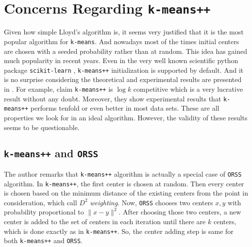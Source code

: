 \documentclass[12pt]{article}
\begin{document}
	\section{Concerns Regarding \texttt{k-means++}}\label{sec:kmeans++vsorss}
	Given how simple Lloyd's algorithm is, it seems very justified that it is the most popular algorithm for \texttt{k-means}. And nowadays most of the times initial centers are chosen with a seeded probability rather than at random. This idea has gained much popularity in recent years. Even in the very well known scientific python package \texttt{scikit-learn} \textcite{pedregosa__et_al_2011}, \texttt{k-means++} initialization is supported by default. And it is no surprise considering the theoretical and experimental results are presented in \textcite{arthur_vassilvitskii_2007}. For example, \textcite{arthur_vassilvitskii_2007} claim \texttt{k-means++} is $\log{k}$ competitive which is a very lucrative result without any doubt. Moreover, they show experimental results that \texttt{k-means++} performs tenfold or even better in most data sets. These are all properties we look for in an ideal algorithm. However, the validity of these results seems to be questionable.
	\subsection{\texttt{k-means++} and \texttt{ORSS}}
	The author remarks that \texttt{k-means++} algorithm is actually a special case of \texttt{ORSS} algorithm. In \texttt{k-means++}, the first center is chosen at random. Then every center is chosen based on the minimum distance of the existing centers from the point in consideration, which \textcite{arthur_vassilvitskii_2007} call $D^2$ \textit{weighting}. Now, \texttt{ORSS} chooses two centers $x,y$ with probability proportional to $\|x-y\|^2$. After choosing those two centers, a new center is added to the set of centers in each iteration until there are $k$ centers, which is done exactly as in \texttt{k-means++}. So, the center adding step is same for both \texttt{k-means++} and \texttt{ORSS}.
\end{document}

